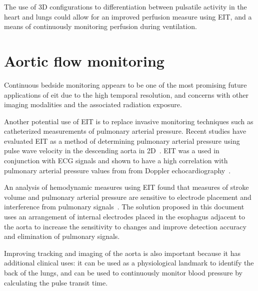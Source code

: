 The use of 3D configurations to differentiation between pulsatile activity 
in the heart and lungs could allow for an improved perfusion measure 
using EIT, and a means of continuously monitoring perfusion during ventilation.

\section{Aortic flow monitoring}

Continuous bedside monitoring appears to be one of the most
promising future applications of \acrshort{eit} due to the high 
temporal resolution, and concerns with other imaging modalities 
and the associated radiation 
exposure. 


Another potential use of EIT is to replace invasive monitoring techniques
such as catheterized measurements of pulmonary arterial pressure.
Recent studies have evaluated EIT as a method of determining 
pulmonary arterial pressure using pulse wave velocity in the 
descending aorta in 2D~\parencite{Braun2018a,Proenca2017,Proenca2016}.
EIT was a used in conjunction with ECG signals and shown to have a high correlation
with pulmonary arterial pressure values from from Doppler echocardiography~\parencite{Proenca2016}.

An analysis of hemodynamic measures using EIT found that measures of stroke 
volume and pulmonary arterial pressure are sensitive to electrode placement and
interference from pulmonary signals~\parencite{Braun2018a}. 
The solution proposed in this document uses an arrangement of internal electrodes placed in the 
esophagus adjacent to the aorta to increase the sensitivity to changes and improve detection 
accuracy and elimination of pulmonary signals.

Improving tracking and imaging of the aorta is also important because it
has additional clinical uses: it  can be used as a physiological landmark to identify
the back of the lungs, and can be used to continuously monitor blood pressure by
calculating the pulse transit time. 



